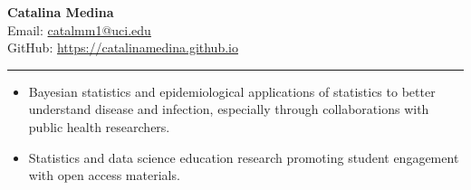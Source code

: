 \documentclass{article}
\makeatletter
\newcommand{\myname}{Catalina Medina}
\newcommand{\myemail}{\href{mailto:catalmm1@uci.edu}{catalmm1@uci.edu}}
\makeatother
\begin{document}
	\thispagestyle{empty}
	\phantom{.}\vspace{-2cm}
	\begin{center}
		{\huge \bf \myname}\\
		Email: \myemail\\
		GitHub: \href{https://github.com/CatalinaMedina}{https://catalinamedina.github.io}
	\end{center}
	
	\vspace{-4mm}
	\rule{\linewidth}{1pt}
	
	
	\begin{description}
		\vspace{-2mm}
		\item[Research Interests]\hspace*{.1in}
		
		\begin{itemize}
			\item Bayesian statistics and epidemiological applications of statistics to better understand disease and infection, especially through collaborations with public health researchers.
			\item Statistics and data science education research promoting student engagement with open access materials. 
		\end{itemize}
	\end{description}
	
\end{document}
